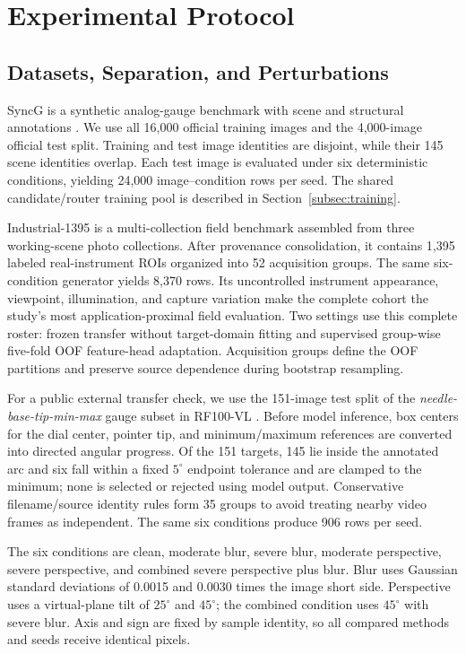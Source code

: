\documentclass[electronics,article,submit,oneauthor]{Definitions/mdpi}
\begin{document}
\section{Experimental Protocol}
\label{sec:protocol}

\subsection{Datasets, Separation, and Perturbations}
\label{subsec:data}

SyncG is a synthetic analog-gauge benchmark with scene and structural annotations \cite{deng2026syncg}. We use all 16,000 official training images and the 4,000-image official test split. Training and test image identities are disjoint, while their 145 scene identities overlap. Each test image is evaluated under six deterministic conditions, yielding 24,000 image--condition rows per seed. The shared candidate/router training pool is described in Section~\ref{subsec:training}.

Industrial-1395 is a multi-collection field benchmark assembled from three working-scene photo collections. After provenance consolidation, it contains 1,395 labeled real-instrument ROIs organized into 52 acquisition groups. The same six-condition generator yields 8,370 rows. Its uncontrolled instrument appearance, viewpoint, illumination, and capture variation make the complete cohort the study's most application-proximal field evaluation. Two settings use this complete roster: frozen transfer without target-domain fitting and supervised group-wise five-fold OOF feature-head adaptation. Acquisition groups define the OOF partitions and preserve source dependence during bootstrap resampling.

For a public external transfer check, we use the 151-image test split of the \emph{needle-base-tip-min-max} gauge subset in RF100-VL \cite{robicheaux2025rf100vl}. Before model inference, box centers for the dial center, pointer tip, and minimum/maximum references are converted into directed angular progress. Of the 151 targets, 145 lie inside the annotated arc and six fall within a fixed $5^{\circ}$ endpoint tolerance and are clamped to the minimum; none is selected or rejected using model output. Conservative filename/source identity rules form 35 groups to avoid treating nearby video frames as independent. The same six conditions produce 906 rows per seed.

The six conditions are clean, moderate blur, severe blur, moderate perspective, severe perspective, and combined severe perspective plus blur. Blur uses Gaussian standard deviations of 0.0015 and 0.0030 times the image short side. Perspective uses a virtual-plane tilt of $25^{\circ}$ and $45^{\circ}$; the combined condition uses $45^{\circ}$ with severe blur. Axis and sign are fixed by sample identity, so all compared methods and seeds receive identical pixels.
\end{document}
